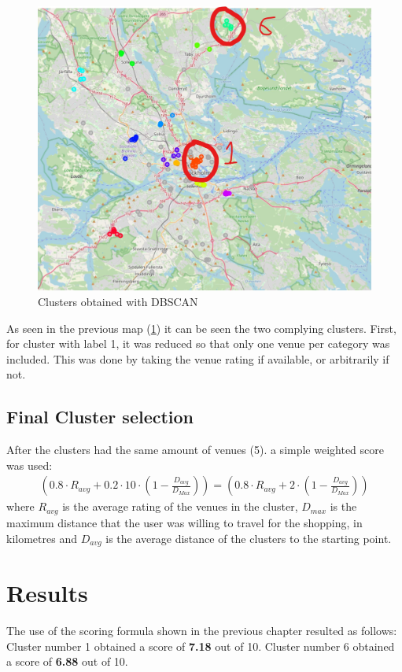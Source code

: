 \documentclass{article}
\begin{document}
	\begin{figure}[H]
		\centering
		\includegraphics[width=\textwidth]{img/map3.jpg}
		\caption{Clusters obtained with DBSCAN}
		\label{fig::map3}
	\end{figure}
	
	As seen in the previous map (\ref{fig::map3}) it can be seen the two complying clusters. First, for cluster with label 1, it was reduced so that only one venue per category was included. This was done by taking the venue rating if available, or arbitrarily if not. 
	\subsection{Final Cluster selection}
	
	After the clusters had the same amount of venues (5). a simple weighted score was used:
	\begin{align*}
		\left(0.8 \cdot R_{avg}+0.2 \cdot 10\cdot \left(1-\frac{D_{avg}}{D_{Max}}\right)\right)=\left(0.8 \cdot R_{avg}+2 \cdot \left(1-\frac{D_{avg}}{D_{Max}}\right)\right)
	\end{align*}
	where $R_{avg}$ is the average rating of the venues in the cluster, $D_{max}$ is the maximum distance that the user was willing to travel for the shopping, in kilometres and $D_{avg}$ is the average distance of the clusters to the starting point.
	\newpage
\section{Results}
	The use of the scoring formula shown in the previous chapter resulted as follows: \\
	Cluster number 1 obtained a score of \textbf{7.18} out of 10.
	\newline
	Cluster number 6 obtained a score of \textbf{6.88} out of 10.
	\newline
	\newline
	
\end{document}
